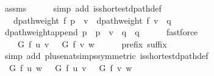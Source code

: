 \begin{isabellebody}
\ assms\isanewline
\ \ \ \ \isamarkupfalse%
\ {\isacharparenleft}{\kern0pt}simp\ add{\isacharcolon}{\kern0pt}\ is{\isacharunderscore}{\kern0pt}shortest{\isacharunderscore}{\kern0pt}dpath{\isacharunderscore}{\kern0pt}def{\isacharparenright}{\kern0pt}\isanewline
\ \ \isamarkupfalse%
\ \isamarkupfalse%
\ {\isachardoublequoteopen}{\isachardot}{\kern0pt}{\isachardot}{\kern0pt}{\isachardot}{\kern0pt}\ {\isacharequal}{\kern0pt}\ dpath{\isacharunderscore}{\kern0pt}weight\ f\ {\isacharparenleft}{\kern0pt}p\ {\isacharat}{\kern0pt}\ {\isacharbrackleft}{\kern0pt}v{\isacharbrackright}{\kern0pt}{\isacharparenright}{\kern0pt}\ {\isacharplus}{\kern0pt}\ dpath{\isacharunderscore}{\kern0pt}weight\ f\ {\isacharparenleft}{\kern0pt}v\ {\isacharhash}{\kern0pt}\ q{\isacharparenright}{\kern0pt}{\isachardoublequoteclose}\isanewline
\ \ \ \ \isamarkupfalse%
\ dpath{\isacharunderscore}{\kern0pt}weight{\isacharunderscore}{\kern0pt}append{\isacharbrackleft}{\kern0pt}\ {\isacharquery}{\kern0pt}p\ {\isacharequal}{\kern0pt}\ {\isachardoublequoteopen}p\ {\isacharat}{\kern0pt}\ {\isacharbrackleft}{\kern0pt}v{\isacharbrackright}{\kern0pt}{\isachardoublequoteclose}\ \ {\isacharquery}{\kern0pt}q\ {\isacharequal}{\kern0pt}\ q{\isacharbrackright}{\kern0pt}\isanewline
\ \ \ \ \isamarkupfalse%
\ fastforce\isanewline
\ \ \isamarkupfalse%
\ \isamarkupfalse%
\ {\isachardoublequoteopen}{\isachardot}{\kern0pt}{\isachardot}{\kern0pt}{\isachardot}{\kern0pt}\ {\isacharequal}{\kern0pt}\ {\isasymdelta}\ G\ f\ u\ v\ {\isacharplus}{\kern0pt}\ {\isasymdelta}\ G\ f\ v\ w{\isachardoublequoteclose}\isanewline
\ \ \ \ \isamarkupfalse%
\ prefix\ suffix\isanewline
\ \ \ \ \isamarkupfalse%
\ {\isacharparenleft}{\kern0pt}simp\ add{\isacharcolon}{\kern0pt}\ plus{\isacharunderscore}{\kern0pt}enat{\isacharunderscore}{\kern0pt}simps{\isacharparenleft}{\kern0pt}{}{\isacharparenright}{\kern0pt}{\isacharbrackleft}{\kern0pt}symmetric{\isacharbrackright}{\kern0pt}\ is{\isacharunderscore}{\kern0pt}shortest{\isacharunderscore}{\kern0pt}dpath{\isacharunderscore}{\kern0pt}def{\isacharparenright}{\kern0pt}\isanewline
\ \ \isamarkupfalse%
\ \isamarkupfalse%
\ {\isachardoublequoteopen}{\isasymdelta}\ G\ f\ u\ w\ {\isacharequal}{\kern0pt}\ {\isasymdelta}\ G\ f\ u\ v\ {\isacharplus}{\kern0pt}\ {\isasymdelta}\ G\ f\ v\ w{\isachardoublequoteclose}\isanewline
\ \ \ \ \isacommand{{\isachardot}{\kern0pt}}\isamarkupfalse%

\end{isabellebody}
